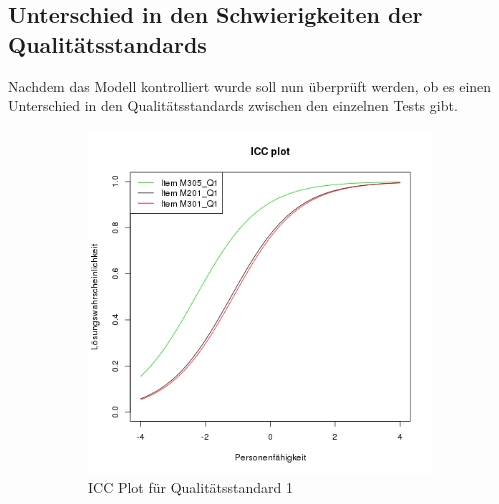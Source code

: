 
\subsection{Unterschied in den Schwierigkeiten der Qualitätsstandards}

Nachdem das Modell kontrolliert wurde soll nun überprüft werden, ob es einen Unterschied in den Qualitätsstandards zwischen den einzelnen Tests gibt.


  
 \begin{figure}[htp]
 \centering
 \begin{subfigure}{0.49\textwidth}
   \includegraphics[width=1.0\linewidth]{graphics/ICCQ1.png}
   \caption{ICC Plot für Qualitätsstandard 1}
   \label{fig:ICCQ1}
 \end{subfigure}
 \begin{subfigure}{0.49\textwidth}

\end{subfigure}
\end{figure}

